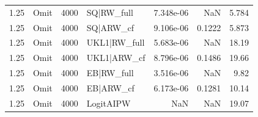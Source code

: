 \begin{tabular}{rlrlrrr}
1.25 & Omit & 4000 & SQ|RW\_full & 7.348e-06 & NaN & 5.784 \\
1.25 & Omit & 4000 & SQ|ARW\_cf & 9.106e-06 & 0.1222 & 5.873 \\
1.25 & Omit & 4000 & UKL1|RW\_full & 5.683e-06 & NaN & 18.19 \\
1.25 & Omit & 4000 & UKL1|ARW\_cf & 8.796e-06 & 0.1486 & 19.66 \\
1.25 & Omit & 4000 & EB|RW\_full & 3.516e-06 & NaN & 9.82 \\
1.25 & Omit & 4000 & EB|ARW\_cf & 6.173e-06 & 0.1281 & 10.14 \\
1.25 & Omit & 4000 & LogitAIPW & NaN & NaN & 19.07 \\
\bottomrule
\end{tabular}
